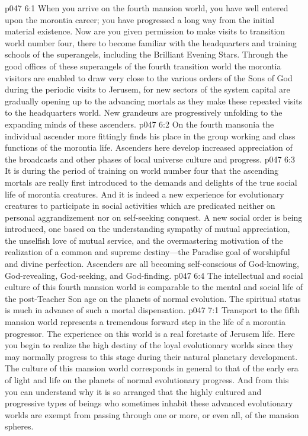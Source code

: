 \vs p047 6:1 When you arrive on the fourth mansion world, you have well entered upon the morontia career; you have progressed a long way from the initial material existence. Now are you given permission to make visits to transition world number four, there to become familiar with the headquarters and training schools of the superangels, including the Brilliant Evening Stars. Through the good offices of these superangels of the fourth transition world the morontia visitors are enabled to draw very close to the various orders of the Sons of God during the periodic visits to Jerusem, for new sectors of the system capital are gradually opening up to the advancing mortals as they make these repeated visits to the headquarters world. New grandeurs are progressively unfolding to the expanding minds of these ascenders.
\vs p047 6:2 On the fourth mansonia the individual ascender more fittingly finds his place in the group working and class functions of the morontia life. Ascenders here develop increased appreciation of the broadcasts and other phases of local universe culture and progress.
\vs p047 6:3 It is during the period of training on world number four that the ascending mortals are really first introduced to the demands and delights of the true social life of morontia creatures. And it is indeed a new experience for evolutionary creatures to participate in social activities which are predicated neither on personal aggrandizement nor on self\hyp{}seeking conquest. A new social order is being introduced, one based on the understanding sympathy of mutual appreciation, the unselfish love of mutual service, and the overmastering motivation of the realization of a common and supreme destiny---the Paradise goal of worshipful and divine perfection. Ascenders are all becoming self\hyp{}conscious of God\hyp{}knowing, God\hyp{}revealing, God\hyp{}seeking, and God\hyp{}finding.
\vs p047 6:4 The intellectual and social culture of this fourth mansion world is comparable to the mental and social life of the post\hyp{}Teacher Son age on the planets of normal evolution. The spiritual status is much in advance of such a mortal dispensation.
\vs p047 7:1 Transport to the fifth mansion world represents a tremendous forward step in the life of a morontia progressor. The experience on this world is a real foretaste of Jerusem life. Here you begin to realize the high destiny of the loyal evolutionary worlds since they may normally progress to this stage during their natural planetary development. The culture of this mansion world corresponds in general to that of the early era of light and life on the planets of normal evolutionary progress. And from this you can understand why it is so arranged that the highly cultured and progressive types of beings who sometimes inhabit these advanced evolutionary worlds are exempt from passing through one or more, or even all, of the mansion spheres.
